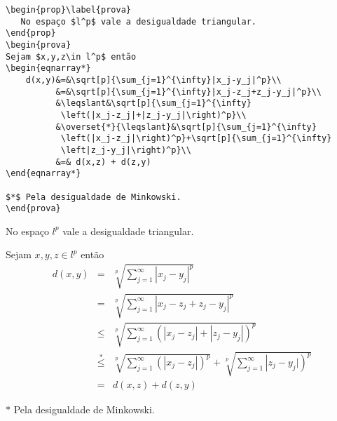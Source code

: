 \begin{tcolorbox}
\begin{lstlisting}
\begin{prop}\label{prova}
   No espaço $l^p$ vale a desigualdade triangular.
\end{prop}
\begin{prova}
Sejam $x,y,z\in l^p$ então
\begin{eqnarray*}
	d(x,y)&=&\sqrt[p]{\sum_{j=1}^{\infty}|x_j-y_j|^p}\\
	      &=&\sqrt[p]{\sum_{j=1}^{\infty}|x_j-z_j+z_j-y_j|^p}\\
	      &\leqslant&\sqrt[p]{\sum_{j=1}^{\infty}
	       \left(|x_j-z_j|+|z_j-y_j|\right)^p}\\
	      &\overset{*}{\leqslant}&\sqrt[p]{\sum_{j=1}^{\infty}
	       \left(|x_j-z_j|\right)^p}+\sqrt[p]{\sum_{j=1}^{\infty}
	       \left|z_j-y_j|\right)^p}\\
	      &=& d(x,z) + d(z,y)
\end{eqnarray*}

$*$ Pela desigualdade de Minkowski.
\end{prova}
\end{lstlisting}

\tcblower

\begin{prop}\label{prova}
   No espaço $l^p$ vale a desigualdade triangular.
\end{prop}
\begin{prova}
Sejam $x,y,z\in l^p$ então
\begin{eqnarray*}
	d(x,y)&=&\sqrt[p]{\sum_{j=1}^{\infty}|x_j-y_j|^p}\\
	      &=&\sqrt[p]{\sum_{j=1}^{\infty}|x_j-z_j+z_j-y_j|^p}\\
	      &\leqslant&\sqrt[p]{\sum_{j=1}^{\infty}
	       \left(|x_j-z_j|+|z_j-y_j|\right)^p}\\
	      &\overset{*}{\leqslant}&\sqrt[p]{\sum_{j=1}^{\infty}
	       \left(|x_j-z_j|\right)^p}+\sqrt[p]{\sum_{j=1}^{\infty}
	       \left|z_j-y_j|\right)^p}\\
	      &=& d(x,z) + d(z,y)
\end{eqnarray*}

$*$ Pela desigualdade de Minkowski.
\end{prova}
\end{tcolorbox}

